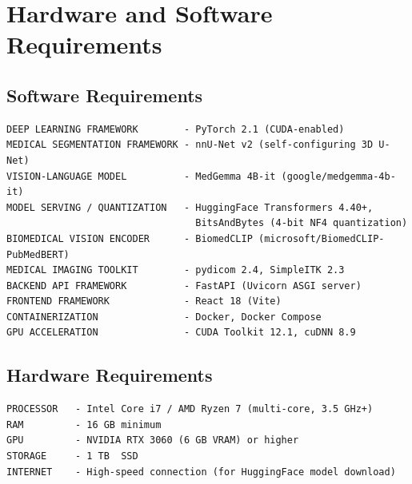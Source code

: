 \documentclass[twoside,a4paper,openright]{report} %
\begin{document}
\section{Hardware and Software Requirements}

\subsection{Software Requirements}
\begin{verbatim}
DEEP LEARNING FRAMEWORK        - PyTorch 2.1 (CUDA-enabled)
MEDICAL SEGMENTATION FRAMEWORK - nnU-Net v2 (self-configuring 3D U-Net)
VISION-LANGUAGE MODEL          - MedGemma 4B-it (google/medgemma-4b-it)
MODEL SERVING / QUANTIZATION   - HuggingFace Transformers 4.40+,
                                 BitsAndBytes (4-bit NF4 quantization)
BIOMEDICAL VISION ENCODER      - BiomedCLIP (microsoft/BiomedCLIP-PubMedBERT)
MEDICAL IMAGING TOOLKIT        - pydicom 2.4, SimpleITK 2.3
BACKEND API FRAMEWORK          - FastAPI (Uvicorn ASGI server)
FRONTEND FRAMEWORK             - React 18 (Vite)
CONTAINERIZATION               - Docker, Docker Compose
GPU ACCELERATION               - CUDA Toolkit 12.1, cuDNN 8.9
\end{verbatim}

\subsection{Hardware Requirements}
\begin{verbatim}
PROCESSOR   - Intel Core i7 / AMD Ryzen 7 (multi-core, 3.5 GHz+)
RAM         - 16 GB minimum
GPU         - NVIDIA RTX 3060 (6 GB VRAM) or higher
STORAGE     - 1 TB  SSD
INTERNET    - High-speed connection (for HuggingFace model download)
\end{verbatim}


\vspace{-0.6cm}

\clearpage
\end{document}
